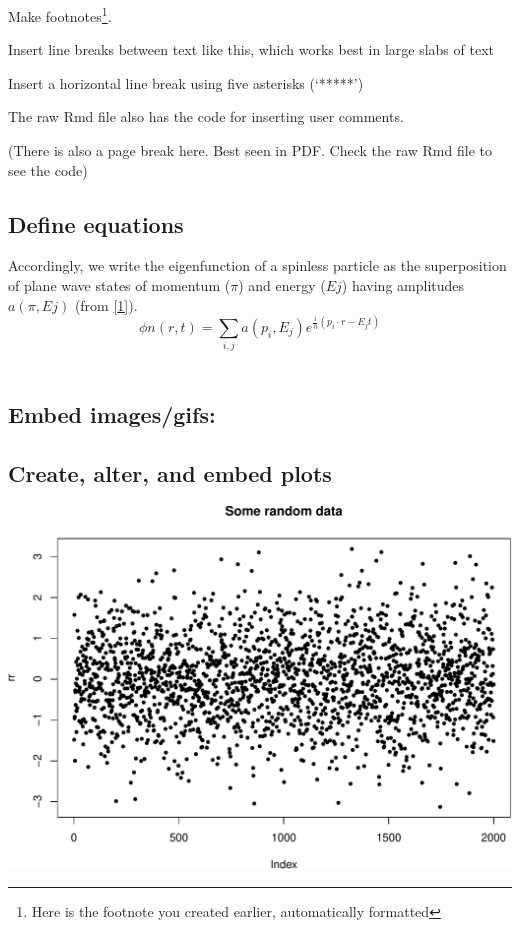 \documentclass[article]{article}
\begin{document}
Make footnotes\footnote{Here is the footnote you created earlier,
  automatically formatted}.

Insert line breaks between text like this, which works best in large
slabs of text

Insert a horizontal line break using five asterisks (`*****')

The raw Rmd file also has the code for inserting user comments.

(There is also a page break here. Best seen in PDF. Check the raw Rmd
file to see the code)

\newpage

\subsection{Define equations}\label{define-equations}

Accordingly, we write the eigenfunction of a spinless particle as the
superposition of plane wave states of momentum (\(\pi\)) and energy
(\(Ej\)) having amplitudes \(a(\pi,Ej)\) (from
\href{https://arxiv.org/vc/quant-ph/papers/0607/0607001v1.pdf}{{[}1{]}}).
\[
\phi n(r,t) =
  \sum_{i, j} a(p_{i},E_{j})
  e^{
    \frac{i}
    {h}
    (p_{i} \cdot r - E_{j}t)
}
\] ~

\subsection{Embed images/gifs:}\label{embed-imagesgifs}

\newpage

\subsection{Create, alter, and embed
plots}\label{create-alter-and-embed-plots}

\includegraphics{Lesson5_rmd_files/figure-latex/unnamed-chunk-1-1.pdf}
\end{document}
